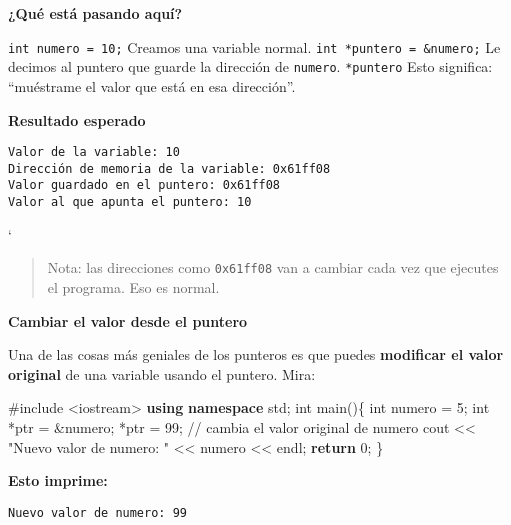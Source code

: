 \documentclass[
  11pt,
  a4paper,
  DIV=11,
  numbers=noendperiod]{scrreprt}
\newenvironment{Shaded}{\begin{snugshade}}{\end{snugshade}}
\newcommand{\CommentTok}[1]{\textcolor[rgb]{0.37,0.37,0.37}{#1}}
\newcommand{\ControlFlowTok}[1]{\textcolor[rgb]{0.00,0.23,0.31}{\textbf{#1}}}
\newcommand{\DataTypeTok}[1]{\textcolor[rgb]{0.68,0.00,0.00}{#1}}
\newcommand{\DecValTok}[1]{\textcolor[rgb]{0.68,0.00,0.00}{#1}}
\newcommand{\ImportTok}[1]{\textcolor[rgb]{0.00,0.46,0.62}{#1}}
\newcommand{\KeywordTok}[1]{\textcolor[rgb]{0.00,0.23,0.31}{\textbf{#1}}}
\newcommand{\NormalTok}[1]{\textcolor[rgb]{0.00,0.23,0.31}{#1}}
\newcommand{\OperatorTok}[1]{\textcolor[rgb]{0.37,0.37,0.37}{#1}}
\newcommand{\PreprocessorTok}[1]{\textcolor[rgb]{0.68,0.00,0.00}{#1}}
\newcommand{\StringTok}[1]{\textcolor[rgb]{0.13,0.47,0.30}{#1}}
\begin{document}
\textbf{¿Qué está pasando aquí?}

\texttt{int\ numero\ =\ 10;} Creamos una variable normal.
\texttt{int\ *puntero\ =\ \&numero;} Le decimos al puntero que guarde la
dirección de \texttt{numero}. \texttt{*puntero} Esto significa:
``muéstrame el valor que está en esa dirección''.

\textbf{Resultado esperado}

\begin{tcolorbox}[custombox] 
\begin{verbatim} 
Valor de la variable: 10 
Dirección de memoria de la variable: 0x61ff08 
Valor guardado en el puntero: 0x61ff08 
Valor al que apunta el puntero: 10 
\end{verbatim} 
\end{tcolorbox}`

\begin{quote}
Nota: las direcciones como \texttt{0x61ff08} van a cambiar cada vez que
ejecutes el programa. Eso es normal.
\end{quote}

\textbf{Cambiar el valor desde el puntero}

Una de las cosas más geniales de los punteros es que puedes
\textbf{modificar el valor original} de una variable usando el puntero.
Mira:

\begin{Shaded}
\begin{Highlighting}[]
\PreprocessorTok{\#include }\ImportTok{\textless{}iostream\textgreater{}}\PreprocessorTok{ }
\KeywordTok{using} \KeywordTok{namespace}\NormalTok{ std}\OperatorTok{;} 
\DataTypeTok{int}\NormalTok{ main}\OperatorTok{()\{}     
    \DataTypeTok{int}\NormalTok{ numero }\OperatorTok{=} \DecValTok{5}\OperatorTok{;}     
    \DataTypeTok{int} \OperatorTok{*}\NormalTok{ptr }\OperatorTok{=} \OperatorTok{\&}\NormalTok{numero}\OperatorTok{;}      
    \OperatorTok{*}\NormalTok{ptr }\OperatorTok{=} \DecValTok{99}\OperatorTok{;} \CommentTok{// cambia el valor original de numero      }
\NormalTok{    cout }\OperatorTok{\textless{}\textless{}} \StringTok{"Nuevo valor de numero: "} \OperatorTok{\textless{}\textless{}}\NormalTok{ numero }\OperatorTok{\textless{}\textless{}}\NormalTok{ endl}\OperatorTok{;}     
    \ControlFlowTok{return} \DecValTok{0}\OperatorTok{;} 
\OperatorTok{\}}
\end{Highlighting}
\end{Shaded}

\textbf{Esto imprime:}

\begin{tcolorbox}[custombox] 
\begin{verbatim} 
Nuevo valor de numero: 99 
\end{verbatim} 
\end{tcolorbox}
\end{document}
